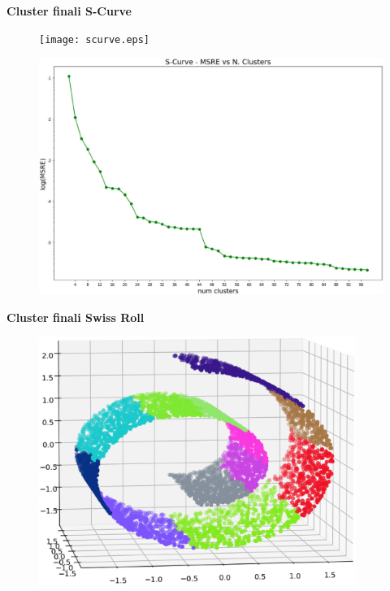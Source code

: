 \documentclass[a4, landscape]{seminar}
\theoremstyle{definition}
\def\bc{\begin{center}}
\def\ec{\end{center}}
\def\bs{\begin{slide}\begingroup\small}
\def\es{\endgroup\end{slide}}
\begin{document}
\bs
\bc{\bf\color{blue}Cluster finali S-Curve}\ec
\begin{figure}[b]
\centering
\texttt{[image: scurve.eps]}
\end{figure}
\es

\bs
\begin{figure}[b]
\centering
\includegraphics[width=\textwidth]{scurve_msre.eps}
\end{figure}
\es

\bs
\bc{\bf\color{blue}Cluster finali Swiss Roll}\ec
\begin{figure}[b]
\centering
\includegraphics[width=0.92\textwidth]{swissroll.eps}
\end{figure}
\es
\end{document}
